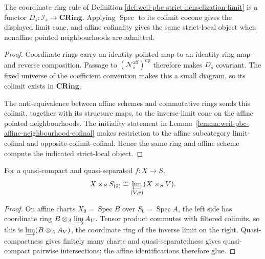 \begin{lemma}
\label{lemma:weil-sf-well-defined-def-weil-pbc-strict-henselization-limit}
The coordinate-ring rule of Definition
\ref{def:weil-pbc-strict-henselization-limit} is a functor
$D_{\bar s}:\mathcal I_{\bar s}\to\mathbf{CRing}$.  Applying
$\operatorname{Spec}$ to its colimit cocone gives the displayed limit cone,
and affine cofinality gives the same strict-local object when nonaffine
pointed neighbourhoods are admitted.
\end{lemma}
\begin{proof}
Coordinate rings carry an identity pointed map to an identity ring map and
reverse composition.  Passage to
$(\mathcal N^{\mathrm{aff}}_{\bar s})^{\mathrm{op}}$ therefore makes
$D_{\bar s}$ covariant.  The fixed universe of the coefficient convention
makes this a small diagram, so its colimit exists in $\mathbf{CRing}$.

The anti-equivalence between affine schemes and commutative rings sends this
colimit, together with its structure maps, to the inverse-limit cone on the
affine pointed neighbourhoods.  The initiality statement in
Lemma~\ref{lemma:weil-pbc-affine-neighbourhood-cofinal} makes restriction to
the affine subcategory limit-cofinal and opposite-colimit-cofinal.  Hence the
same ring and affine scheme compute the indicated strict-local object.
\end{proof}
\begin{lemma}
\label{lemma:weil-pbc-fibre-product-limit}
For a quasi-compact and quasi-separated $f:X\to S$,
\[
 X\times_SS_{(\bar s)}\cong
 \varprojlim_{(V,\bar v)}(X\times_SV).
\]
\end{lemma}
\begin{proof}
\uses{} 
On affine charts $X_0=\operatorname{Spec}B$ over
$S_0=\operatorname{Spec}A$, the left side has coordinate ring
$B\otimes_A\varinjlim A_V$.  Tensor product commutes with filtered colimits,
so this is $\varinjlim(B\otimes_AA_V)$, the coordinate ring of the inverse
limit on the right.  Quasi-compactness gives finitely many charts and
quasi-separatedness gives quasi-compact pairwise intersections; the affine
identifications therefore glue.
\end{proof}

